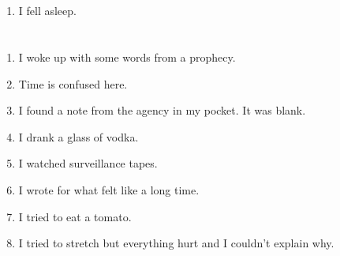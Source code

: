 \documentclass{article}
\begin{document}
    \newpage
    
    \section{}
    
    \begin{enumerate}
    
    \item I fell asleep.\\
    
    \end{enumerate}
     
    \newpage
    
    \section{}
    
    \begin{enumerate}
    
    \item I woke up with some words from a prophecy.\\
    
    \item Time is confused here.\\
    
    \item I found a note from the agency in my pocket. It was blank.\\
    
    \item I drank a glass of vodka.\\
    
    \item I watched surveillance tapes.\\
    
    \item I wrote for what felt like a long time.\\
    
    \item I tried to eat a tomato.\\
    
    \item I tried to stretch but everything hurt and I couldn't explain why.\\
    
    \end{enumerate}
     
    \newpage
    
\end{document}
